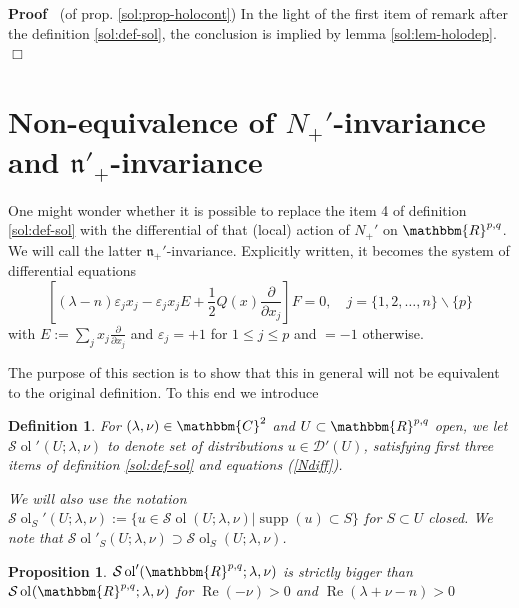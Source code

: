 \documentclass{article}
\newcommand{\assign}{:=}
\newcommand{\tmop}[1]{\ensuremath{\operatorname{#1}}}
\newenvironment{proof}{\noindent\textbf{Proof\ }}{\hspace*{\fill}$\Box$\medskip}
\newtheorem{definition}{Definition}
\numberwithin{definition}{section}
\numberwithin{lemma}{section}
\newtheorem{proposition}{Proposition}
\numberwithin{proposition}{section}
{\theorembodyfont{\rmfamily}\newtheorem{remark}{Remark}
\numberwithin{remark}{section}
}
\begin{document}
\begin{proof}
  (of prop. \ref{sol:prop-holocont}) In the light of the first item of remark
  after the definition \ref{sol:def-sol}, the conclusion is implied by lemma
  \ref{sol:lem-holodep}.
\end{proof}

\section{Non-equivalence of $N_+'$-invariance and
$\mathfrak{n}'_+$-invariance}\label{sec:n-nonequiv}

One might wonder whether it is possible to replace the item 4 of definition
\ref{sol:def-sol} with the differential of that (local) action of $N_+'$ on
$\mathbbm{R}^{p, q}$. We will call the latter $\mathfrak{n}_+'$-invariance.
Explicitly written, it becomes the system of differential equations
\begin{equation}
  \left[ (\lambda - n) \varepsilon_j x_j - \varepsilon_j x_j E + \frac{1}{2} Q
  (x) \frac{\partial}{\partial x_j} \right] F = 0, \hspace{1em} j = \{ 1, 2,
  \ldots, n \} \backslash \{ p \} \label{Ndiff}
\end{equation}
with $E \assign \sum_j x_j  \frac{\partial}{\partial x_j}$ and $\varepsilon_j
= + 1$ for $1 \leq j \leq p$ and $= - 1$ otherwise.

The purpose of this section is to show that this in general will not be
equivalent to the original definition. To this end we introduce

\begin{definition}
  \label{n-nonequiv:def-solprime}For $( \lambda, \nu) \in \mathbbm{C}^2$ and
  $U \subset \mathbbm{R}^{p, q}$ open, we let $\mathcal{S} \tmop{ol}'_{} ( U ;
  \lambda, \nu)$ to denote set of distributions $u \in \mathcal{D}' ( U)$,
  satisfying first three items of definition \ref{sol:def-sol} and equations
  (\ref{Ndiff}).
  
  We will also use the notation $\mathcal{S} \tmop{ol}_S' ( U ; \lambda, \nu)
  \assign \{ u \in \mathcal{S} \tmop{ol} ( U ; \lambda, \nu) | \tmop{supp} (
  u) \subset S \}$ for $S \subset U$ closed. We note that $\mathcal{S}
  \tmop{ol}'_S ( U ; \lambda, \nu) \supset \mathcal{S} \tmop{ol}_S ( U ;
  \lambda, \nu)$.
\end{definition}

\begin{proposition}
  $\mathcal{S} \tmop{ol}'_{} ( \mathbbm{R}^{p, q} ; \lambda, \nu)$ is strictly
  bigger than $\mathcal{S} \tmop{ol}_{} ( \mathbbm{R}^{p, q} ; \lambda, \nu)$
  for $\tmop{Re} (- \nu) > 0$ and $\tmop{Re} (\lambda + \nu - n) > 0$
\end{proposition}
\end{document}
